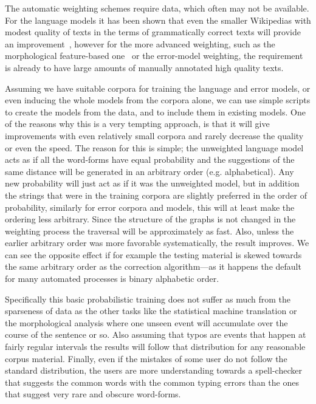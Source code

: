 \documentclass[a4paper,12pt]{article}
\begin{document}
The automatic weighting schemes require data, which often may not be available.
For the language models it has been shown that even the smaller Wikipedias
with modest quality of texts in the terms of grammatically correct texts will
provide an improvement~\cite[]{pirinen/2010/lrec}, however for the more
advanced weighting, such as the morphological feature-based
one~\cite[]{pirinen2012improving} or the error-model weighting, the requirement
is already to have large amounts of manually annotated high quality texts. 

Assuming we have suitable corpora for training the language and error models,
or even inducing the whole models from the corpora alone, we can use simple
scripts to create the models from the data, and to include them in existing
models. One of the reasons why this is a very tempting approach, is that it
will give improvements with even relatively small corpora and rarely decrease
the quality or even the speed. The reason for this is simple; the unweighted
language model acts as if all the word-forms have equal probability and the
suggestions of the same distance will be generated in an arbitrary order (e.g.
alphabetical). Any new probability will just act as if it was the unweighted
model, but in addition the strings that were in the training corpora are
slightly preferred in the order of probability, similarly for error corpora and
models, this will at least make the ordering less arbitrary. Since the
structure of the graphs is not changed in the weighting process the traversal
will be approximately as fast. Also, unless the earlier arbitrary order was
more favorable systematically, the result improves. We can see the opposite
effect if for example the testing material is skewed towards the same arbitrary
order as the correction algorithm---as it happens the default for many
automated processes is binary alphabetic order.

Specifically this basic probabilistic training does not suffer as much from the
sparseness of data as the other tasks like the statistical machine translation
or the morphological analysis where one unseen event will accumulate over the
course of the sentence or so. Also assuming that typos are events that happen
at fairly regular intervals the results will follow that distribution for any
reasonable corpus material. Finally, even if the mistakes of some user do not
follow the standard distribution, the users are more understanding towards a
spell-checker that suggests the common words with the common typing errors than
the ones that suggest very rare and obscure word-forms.
\end{document}
